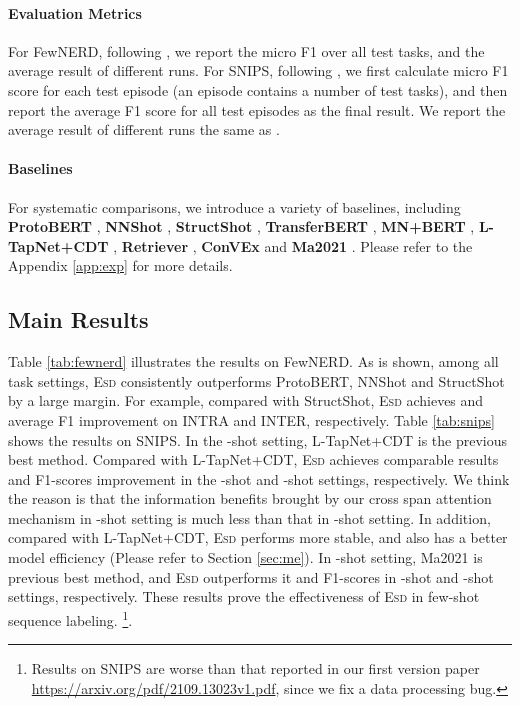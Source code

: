 \documentclass[11pt]{article}
\newcommand{\modelname}{\textsc{Esd}\xspace}
\begin{document}
\paragraph{Evaluation Metrics}
For FewNERD, following \cite{FewNERD}, we report the micro F1 over all test tasks, and the average result of  different runs.
For SNIPS, following \cite{fewshothou}, we first calculate micro F1 score for each test episode (an episode contains a number of test tasks), and then report the average F1 score for all test episodes as the final result.
We report the average result of  different runs the same as \cite{fewshothou}.


\paragraph{Baselines}
For systematic comparisons, we introduce a variety of baselines, including
\textbf{ProtoBERT} \cite{FewNERD,fewshothou}, \textbf{NNShot} \cite{FewNERD}, \textbf{StructShot} \cite{FewNERD},
\textbf{TransferBERT} \cite{fewshothou}, \textbf{MN+BERT} \cite{fewshothou}, \textbf{L-TapNet+CDT} \cite{fewshothou},
\textbf{Retriever} \cite{span-naacl}, \textbf{ConVEx} \cite{convex} and \textbf{Ma2021} \cite{mrc-few-slot}.
Please refer to the Appendix \ref{app:exp} for more details.

\subsection{Main Results}

Table \ref{tab:fewnerd} illustrates the results on FewNERD. 
As is shown, among all task settings, \modelname consistently outperforms ProtoBERT, NNShot and StructShot  by a large margin.
For example, compared with StructShot, \modelname achieves  and   average F1 improvement on INTRA and INTER, respectively.
Table \ref{tab:snips} shows the results on SNIPS.
In the -shot setting, L-TapNet+CDT is the previous best method.
Compared with L-TapNet+CDT, \modelname achieves comparable results and  F1-scores improvement in the -shot and -shot settings, respectively.
We think the reason is that the information benefits brought by our cross span attention mechanism in -shot setting is much less than that in -shot setting.
In addition, compared with L-TapNet+CDT, \modelname performs more stable, and also has a better model efficiency (Please refer to Section \ref{sec:me}).
In -shot setting, Ma2021 is previous best method, and \modelname outperforms it  and  F1-scores in -shot and -shot settings, respectively.
These results prove the effectiveness of \modelname in few-shot sequence labeling.
\footnote{Results on SNIPS are worse than that reported in our first version paper \url{https://arxiv.org/pdf/2109.13023v1.pdf}, since we fix a data processing bug.}.
\end{document}
